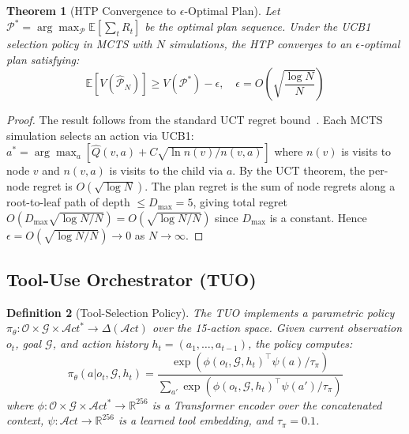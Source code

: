 \documentclass[10pt,conference]{IEEEtran}
\theoremstyle{ieeethm}
\newtheorem{theorem}{Theorem}
\theoremstyle{ieeedef}
\newtheorem{definition}[theorem]{Definition}
\theoremstyle{ieeeremark}
\begin{document}
\begin{theorem}[HTP Convergence to $\epsilon$-Optimal Plan]
\label{thm:htp_convergence}
Let $\mathcal{P}^* = \arg\max_{\mathcal{P}} \mathbb{E}[\sum_t R_t]$ be the optimal plan sequence. Under the UCB1 selection policy in MCTS with $N$ simulations, the HTP converges to an $\epsilon$-optimal plan satisfying:
\begin{equation}
\mathbb{E}[V(\hat{\mathcal{P}}_N)] \geq V(\mathcal{P}^*) - \epsilon, \quad \epsilon = O\!\left(\sqrt{\frac{\log N}{N}}\right)
\label{eq:htp_convergence}
\end{equation}
\end{theorem}
\begin{proof}
The result follows from the standard UCT regret bound~\cite{kocsis2006bandit}. Each MCTS simulation selects an action via UCB1: $a^* = \arg\max_a \left[\hat{Q}(v,a) + C\sqrt{\ln n(v)/n(v,a)}\right]$ where $n(v)$ is visits to node $v$ and $n(v,a)$ is visits to the child via $a$. By the UCT theorem, the per-node regret is $O(\sqrt{\log N})$. The plan regret is the sum of node regrets along a root-to-leaf path of depth $\leq D_\text{max} = 5$, giving total regret $O(D_\text{max} \sqrt{\log N / N}) = O(\sqrt{\log N / N})$ since $D_\text{max}$ is a constant. Hence $\epsilon = O(\sqrt{\log N / N}) \to 0$ as $N \to \infty$.
\end{proof}

\subsection{Tool-Use Orchestrator (TUO)}
\label{sec:tuo}

\begin{definition}[Tool-Selection Policy]
\label{def:tool_policy}
The TUO implements a parametric policy $\pi_\theta : \mathcal{O} \times \mathcal{G} \times \mathcal{A}ct^* \to \Delta(\mathcal{A}ct)$ over the 15-action space. Given current observation $o_t$, goal $\mathcal{G}$, and action history $h_t = (a_1, \ldots, a_{t-1})$, the policy computes:
\begin{equation}
\pi_\theta(a|o_t, \mathcal{G}, h_t) = \frac{\exp(\phi(o_t, \mathcal{G}, h_t)^\top \psi(a) / \tau_\pi)}{\sum_{a'} \exp(\phi(o_t, \mathcal{G}, h_t)^\top \psi(a') / \tau_\pi)}
\label{eq:tool_policy}
\end{equation}
where $\phi : \mathcal{O} \times \mathcal{G} \times \mathcal{A}ct^* \to \mathbb{R}^{256}$ is a Transformer encoder over the concatenated context, $\psi : \mathcal{A}ct \to \mathbb{R}^{256}$ is a learned tool embedding, and $\tau_\pi = 0.1$.
\end{definition}
\end{document}
